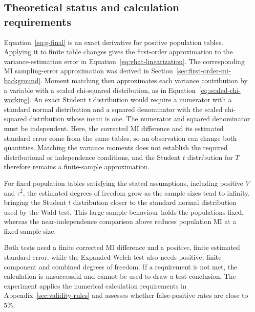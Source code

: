 \begin{samepage}
\subsection{Theoretical status and calculation requirements}

Equation~\eqref{eq:g-final} is an exact derivative for positive population
tables. Applying it to finite table changes gives the first-order
approximation to the variance-estimation error in
Equation~\eqref{eq:vhat-linearization}. The corresponding MI sampling-error
approximation was derived in Section~\ref{sec:first-order-mi-background}. Moment matching then
approximates each variance contribution by a variable with a scaled
chi-squared distribution, as in Equation~\eqref{eq:scaled-chi-working}.
An exact Student \(t\) distribution would require a numerator with a
standard normal distribution and a squared denominator with the scaled
chi-squared distribution whose mean is one. The numerator and squared denominator must be
independent. Here, the corrected MI
difference and its estimated standard error come from the same tables, so
an observation can change both quantities. Matching the variance moments
does not establish the required
distributional or independence conditions, and the Student \(t\) distribution
for \(T\) therefore remains a finite-sample approximation.

For fixed population tables satisfying the stated assumptions, including
positive \(V\) and \(\tau^2\), the estimated degrees of freedom grow as
the sample sizes tend to infinity, bringing the Student \(t\) distribution
closer to the standard normal distribution used by the Wald test. This large-sample behaviour holds the
populations fixed, whereas the near-independence comparison above reduces
population MI at a fixed sample size.
\par\nopagebreak[4]

Both tests need a finite corrected MI difference and a positive, finite
estimated standard error, while the Expanded Welch test also needs positive, finite component
and combined degrees of freedom. If a requirement is not met, the calculation
is unsuccessful and cannot be used to draw a test conclusion.
The experiment applies the numerical calculation requirements in
Appendix~\ref{sec:validity-rules} and assesses whether false-positive rates
are close to 5\%.
\par
\end{samepage}
